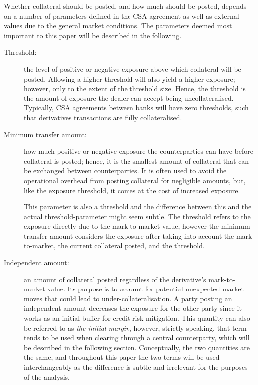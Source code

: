 \documentclass[main.tex]{subfiles}
\begin{document}
        Whether collateral should be posted, and how much should be posted, 
        depends on a number of parameters defined in the CSA agreement
        as well as external values due to the general market conditions.
        The parameters deemed most important to this paper will be described in the following.
        \begin{description}
            \item[Threshold:] 
            the level of positive or negative exposure above which collateral will be posted. 
            Allowing a higher threshold will also yield a higher exposure;
            however, only to the extent of the threshold size. 
            Hence, the threshold is the amount of exposure the dealer can accept being uncollateralised.
            Typically, CSA agreements between banks will have zero thresholds, 
            such that derivatives transactions are fully collateralised.
            
            \item[Minimum transfer amount:] 
            how much positive or negative exposure the counterparties can have before collateral is posted;
            hence, it is the smallest amount of collateral that can be exchanged between counterparties.
            It is often used to avoid the operational overhead from posting collateral for negligible amounts,
            but, like the exposure threshold, it comes at the cost of increased exposure.

            This parameter is also a threshold and the difference between this
            and the actual threshold-parameter might seem subtle.
            The threshold refers to the exposure directly due to the mark-to-market value,
            however the minimum transfer amount considers the exposure after taking into 
            account the mark-to-market, the current collateral posted, and the threshold.

            \item[Independent amount:]
            an amount of collateral posted regardless of the derivative's mark-to-market value. 
            Its purpose is to account for potential unexpected market moves
            that could lead to under-collateralisation.
            A party posting an independent amount decreases the exposure for the other party
            since it works as an initial buffer for credit risk mitigation.
            This quantity can also be referred to as \textit{the initial margin}, 
            however, strictly speaking, 
            that term tends to be used when clearing through a central counterparty,
            which will be described in the following section.
            Conceptually, the two quantities are the same, and throughout this paper
            the two terms will be used interchangeably as the difference is subtle
            and irrelevant for the purposes of the analysis. 


\end{description}
\end{document}
